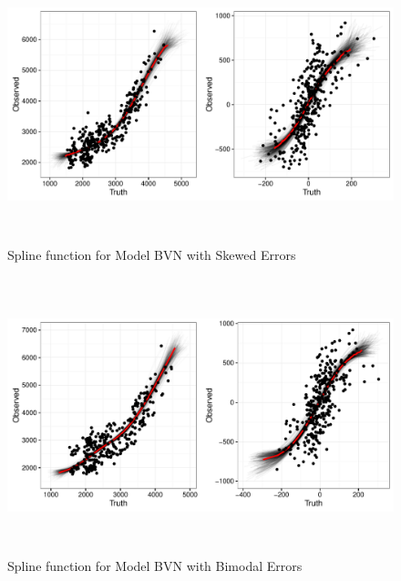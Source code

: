\documentclass[11pt]{article}\usepackage[]{graphicx}\usepackage[]{color}
\begin{document}
  \begin{figure}
  \centering
  \includegraphics[width=17cm,height=8cm]{manual_figure/predbvnsx.pdf}
  \caption{Spline function for Model BVN with Skewed Errors}
  \label{predbvnsx}
  \end{figure}

  \begin{figure}
  \centering
  \includegraphics[width=17cm,height=8cm]{manual_figure/predbvnbx.pdf}
  \caption{Spline function for Model BVN with Bimodal Errors}
  \label{predbvnbx}
  \end{figure}
\end{document}

